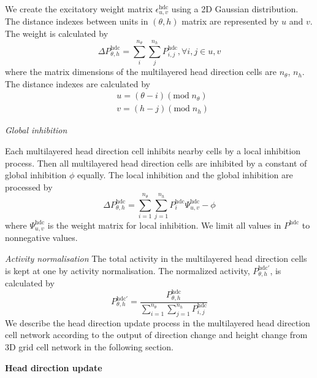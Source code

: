 We create the excitatory weight matrix $\epsilon_{u,v}^{\text{hdc}}$ using a 2D Gaussian distribution. The distance indexes between units in $(\theta, h)$ matrix are represented by $u$ and $v$. 
The weight is calculated by
\begin{equation}
	\Delta P_{\theta, h}^{\text{hdc}} = 
		\sum_{i}^{n_\theta}
		\sum_{j}^{n_h}
		P_{i,j}^{\text{hdc}},
		\forall i,j \in u,v
\end{equation}
where the matrix dimensions of the multilayered head direction cells are $n_\theta$, $n_h$. 
The distance indexes are calculated by
\begin{equation}
	\begin{aligned}
		& u = (\theta - i) (\text{mod} \; n_\theta) \\
		& v = (h - j) (\text{mod} \; n_h)
	\end{aligned}
\end{equation}

\textit{Global inhibition}

Each multilayered head direction cell inhibits nearby cells by a local inhibition process. 
Then all multilayered head direction cells are inhibited by a constant of global inhibition $\phi$ equally. 
The local inhibition and the global inhibition are processed by
\begin{equation}
	\Delta P_{\theta, h} ^{\text{hdc}} = 
		\sum_{i=1}^{n_\theta}
		\sum_{j=1}^{n_h}
		P_i^{\text{hdc}}
		\Psi_{u,v}^{\text{hdc}}
		- \phi
\end{equation}
where $\Psi_{u,v}^{\text{hdc}}$ is the weight matrix for local inhibition. 
We limit all values in $P^{\text{hdc}}$ to nonnegative values.


\textit{Activity normalisation}
The total activity in the multilayered head direction cells is kept at one by activity normalisation. 
The normalized activity, $P_{\theta, h}^{\text{hdc}'}$, is calculated by
\begin{equation}
	P_{\theta,h}^{\text{hdc}'} = 
		\frac
		{
			P_{\theta, h}^{\text{hdc}}
		}
		{
			\sum_{i=1}^{n_\theta}
			\sum_{j=1}^{n_h}
			P_{i,j}^{\text{hdc}}
		}
\end{equation}
We describe the head direction update process in the multilayered head direction cell network according to the output of direction change and height change from 3D grid cell network in the following section.


\textbf{Head direction update}

